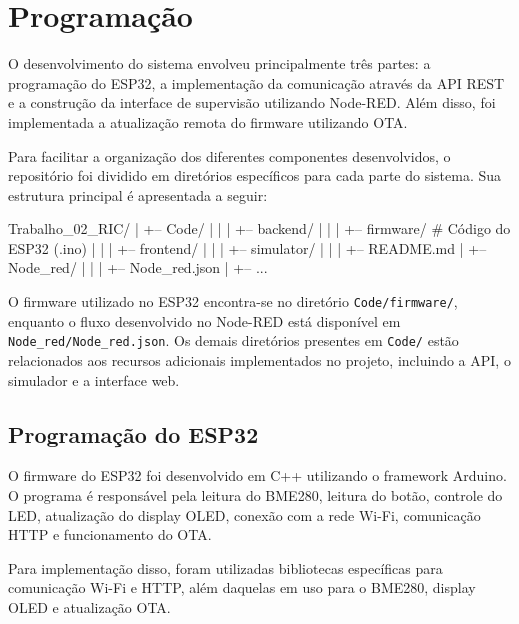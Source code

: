 
\vspace{5mm}
\section{Programação}
\label{sec:programacao}

O desenvolvimento do sistema envolveu principalmente três partes: a programação do ESP32, a implementação da comunicação através da API REST e a construção da interface de supervisão utilizando Node-RED. Além disso, foi implementada a atualização remota do firmware utilizando OTA.

Para facilitar a organização dos diferentes componentes desenvolvidos, o repositório foi dividido em diretórios específicos para cada parte do sistema. Sua estrutura principal é apresentada a seguir:

\begin{repobox}
	Trabalho\_02\_RIC/
	|
	+-- Code/
	|   |
	|   +-- backend/          
	|   |
	|   +-- firmware/         # Código do ESP32 (.ino)
	|   |
	|   +-- frontend/         
	|   |
	|   +-- simulator/        
	|   |
	|   +-- README.md         
	|
	+-- Node\_red/
	|   |
	|   +-- Node\_red.json     
	|
	+-- ...
\end{repobox}

O firmware utilizado no ESP32 encontra-se no diretório \texttt{Code/firmware/}, enquanto o fluxo desenvolvido no Node-RED está disponível em \texttt{Node\_red/Node\_red.json}. Os demais diretórios presentes em \texttt{Code/} estão relacionados aos recursos adicionais implementados no projeto, incluindo a API, o simulador e a interface web.

\vspace{3mm}
\subsection{Programação do ESP32}

O firmware do ESP32 foi desenvolvido em C++ utilizando o framework Arduino. O programa é responsável pela leitura do BME280, leitura do botão, controle do LED, atualização do display OLED, conexão com a rede Wi-Fi, comunicação HTTP e funcionamento do OTA.

Para implementação disso, foram utilizadas bibliotecas específicas para comunicação Wi-Fi e HTTP, além daquelas em uso para o BME280, display OLED e atualização OTA.

